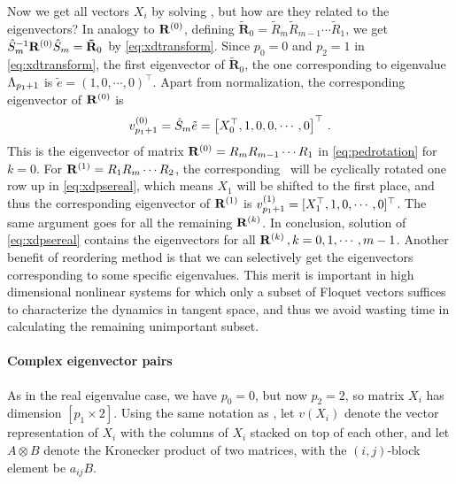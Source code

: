 \documentclass[final,leqno,onefignum,onetabnum]{siamltexmm}
\begin{document}
Now we get all vectors $X_{i}$ by solving \pse, but how are they related
to the eigenvectors? In analogy to $\mathbf{R}^{(0)}$, defining
$\mathbf{\tilde{R}}_{0}=\tilde{R}_{m}\tilde{R}_{m-1}\cdots
\tilde{R}_{1}$, we get
$\hat{S}_{m}^{-1}\mathbf{R}^{(0)}\hat{S}_{m}=\mathbf{\tilde{R}}_{0}$ by
\eqref{eq:xdtransform}. Since $p_{0}=0$ and $p_{2}=1$ in
\eqref{eq:xdtransform}, the first eigenvector of
$\mathbf{\tilde{R}}_{0}$, the one corresponding to eigenvalue
$\Lambda_{p_1+1}$
is $\tilde{e}=(1,0,\cdots , 0)^\top $. Apart from
normalization, the corresponding eigenvector of $\mathbf{R}^{(0)}$ is
\[
v_{p_{1}+1}^{(0)}=\hat{S}_{m}\tilde{e}
 = \left[X_{0}^\top , 1, 0, 0, \cdots, 0 \right]^\top
\,.
\]
This is the eigenvector of matrix $\mathbf{R}^{(0)}=R_{m}R_{m-1}\cdots R_{1}$ in
\eqref{eq:pedrotation} for $k=0$. For $\mathbf{R}^{(1)}=R_{1}R_{m}\cdots R_{2}$,
the corresponding \pse\ will be cyclically rotated one row up {in
\eqref{eq:xdpsereal}, which means $X_{1}$ will be shifted to the first
place, and thus the corresponding eigenvector of}
$\mathbf{R}^{(1)}$ is $v_{p_{1}+1}^{(1)}=[X_{1}^\top,1,0,\cdots,0]^\top $. The
same argument goes for all the {remaining $\mathbf{R}^{(k)}$.}
In conclusion, solution of \eqref{eq:xdpsereal} contains the eigenvectors
for all $\mathbf{R}^{(k)}\,,k=0,1,\cdots,m-1$.
Another benefit of reordering method is that we can selectively
get the eigenvectors corresponding to some specific eigenvalues.
This merit is important in high dimensional nonlinear systems for
which only a subset of Floquet vectors suffices to characterize the
dynamics in tangent space, and thus we avoid wasting time in calculating
{the remaining unimportant subset}.

\paragraph{Complex eigenvector pairs}
As in the real eigenvalue case, we have $p_{0}=0$, but now $p_{2}=2$, so
matrix $X_{i}$  has dimension $[p_{1}\!\times\! 2]$. Using the same
notation as , let $v(X_{i})$ denote the vector
representation of $X_{i}$ with the columns of $X_{i}$ stacked on top of
each other, and let $A\otimes B$ denote the Kronecker product of two
matrices, with the $(i,j)$-block element be $a_{ij}B$.
\end{document}
